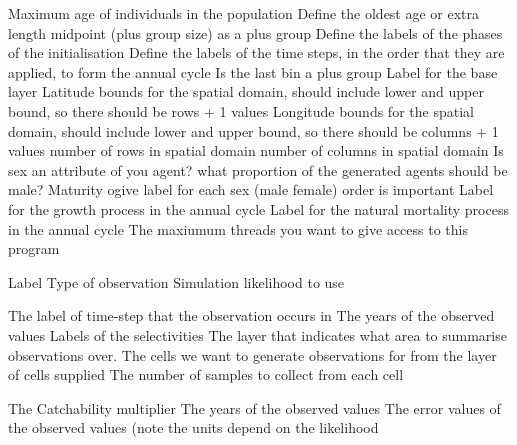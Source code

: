  {Maximum age of individuals in the population}
 {Define the oldest age or extra length midpoint (plus group size) as a plus group}
 {Define the labels of the phases of the initialisation}
 {Define the labels of the time steps, in the order that they are applied, to form the annual cycle}
 {}
 {Is the last bin a plus group}
 {Label for the base layer}
 {Latitude bounds for the spatial domain, should include lower and upper bound, so there should be rows + 1 values}
 {Longitude bounds for the spatial domain, should include lower and upper bound, so there should be columns + 1 values}
 {number of rows in spatial domain}
 {number of columns in spatial domain}
 {Is sex an attribute of you agent?}
 {what proportion of the generated agents should be male?}
 {Maturity ogive label for each sex (male female) order is important}
 {Label for the growth process in the annual cycle}
 {Label for the natural mortality process in the annual cycle}
 {The maxiumum threads you want to give access to this program}
\par\par
{} {Label}
 {Type of observation}
 {Simulation likelihood to use}
\par\textbf{}\par
{} {The label of time-step that the observation occurs in}
 {The years of the observed values}
 {Labels of the selectivities}
 {The layer that indicates what area to summarise observations over.}
 {The cells we want to generate observations for from the layer of cells supplied}
 {The number of samples to collect from each cell}
\par\textbf{}\par
{} {The Catchability multiplier}
 {The years of the observed values}
 {The error values of the observed values (note the units depend on the likelihood}
